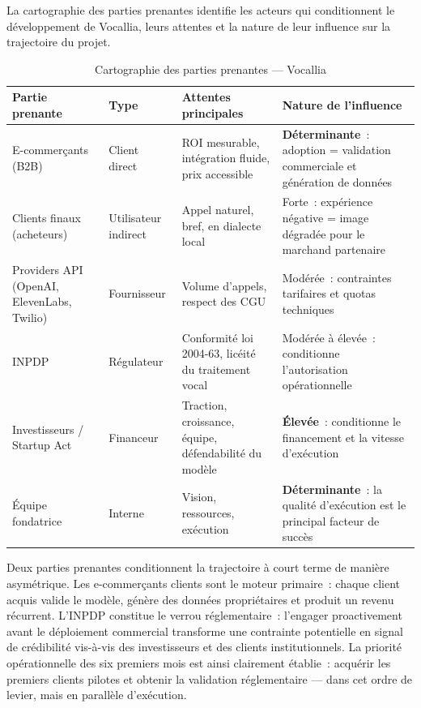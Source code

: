 La cartographie des parties prenantes identifie les acteurs qui conditionnent le développement de Vocallia, leurs attentes et la nature de leur influence sur la trajectoire du projet.

\begin{table}[H]
\centering
\caption{Cartographie des parties prenantes --- Vocallia}
\smallskip
\begin{tabular}{|p{2.5cm}|p{2cm}|p{4cm}|p{4cm}|}
\hline
\textbf{Partie prenante} & \textbf{Type} & \textbf{Attentes principales} & \textbf{Nature de l'influence} \\
\hline
E-commerçants (B2B) & Client direct & ROI mesurable, intégration fluide, prix accessible & \textbf{Déterminante}~: adoption = validation commerciale et génération de données \\
\hline
Clients finaux (acheteurs) & Utilisateur indirect & Appel naturel, bref, en dialecte local & Forte~: expérience négative = image dégradée pour le marchand partenaire \\
\hline
Providers API (OpenAI, ElevenLabs, Twilio) & Fournisseur & Volume d'appels, respect des CGU & Modérée~: contraintes tarifaires et quotas techniques \\
\hline
INPDP & Régulateur & Conformité loi 2004-63, licéité du traitement vocal & Modérée à élevée~: conditionne l'autorisation opérationnelle \\
\hline
Investisseurs / Startup Act & Financeur & Traction, croissance, équipe, défendabilité du modèle & \textbf{Élevée}~: conditionne le financement et la vitesse d'exécution \\
\hline
Équipe fondatrice & Interne & Vision, ressources, exécution & \textbf{Déterminante}~: la qualité d'exécution est le principal facteur de succès \\
\hline
\end{tabular}
\end{table}

Deux parties prenantes conditionnent la trajectoire à court terme de manière asymétrique. Les e-commerçants clients sont le moteur primaire~: chaque client acquis valide le modèle, génère des données propriétaires et produit un revenu récurrent. L'INPDP constitue le verrou réglementaire~: l'engager proactivement avant le déploiement commercial transforme une contrainte potentielle en signal de crédibilité vis-à-vis des investisseurs et des clients institutionnels. La priorité opérationnelle des six premiers mois est ainsi clairement établie~: acquérir les premiers clients pilotes et obtenir la validation réglementaire --- dans cet ordre de levier, mais en parallèle d'exécution.

